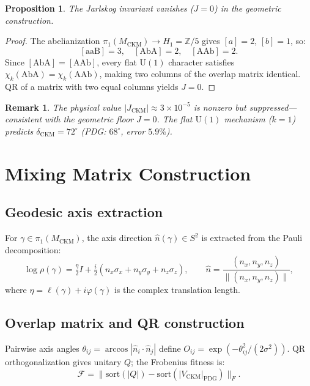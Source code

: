 \documentclass[11pt,a4paper]{article}
\newtheorem{proposition}{Proposition}
\newtheorem{remark}{Remark}
\newcommand{\CKM}{V_{\mathrm{CKM}}}
\begin{document}
\begin{proposition}
The Jarlskog invariant vanishes ($J=0$) in the geometric construction.
\end{proposition}

\begin{proof}
The abelianization $\pi_1(M_{\mathrm{CKM}})\to H_1=\mathbb{Z}/5$
gives $[a]=2$, $[b]=1$, so:
\[
  [\mathrm{aaB}]=3,\quad
  [\mathrm{AbA}]=2,\quad
  [\mathrm{AAb}]=2.
\]
Since $[\mathrm{AbA}]=[\mathrm{AAb}]$, every flat $\mathrm{U}(1)$
character satisfies $\chi_k(\mathrm{AbA})=\chi_k(\mathrm{AAb})$,
making two columns of the overlap matrix identical.
QR of a matrix with two equal columns yields $J=0$.
\end{proof}

\begin{remark}
The physical value $|J_{\mathrm{CKM}}|\approx3\times10^{-5}$ is
nonzero but suppressed---consistent with the geometric floor $J=0$.
The flat $\mathrm{U}(1)$ mechanism ($k=1$) predicts
$\delta_{\mathrm{CKM}}=72^\circ$ (PDG: $68^\circ$, error $5.9\%$).
\end{remark}

\section{Mixing Matrix Construction}
\label{sec:mixing}

\subsection{Geodesic axis extraction}

For $\gamma\in\pi_1(M_{\mathrm{CKM}})$, the axis direction
$\hat{n}(\gamma)\in S^2$ is extracted from the Pauli decomposition:
\[
  \log\rho(\gamma)
  = \tfrac{\eta}{2}I
  + \tfrac{i}{2}(n_x\sigma_x+n_y\sigma_y+n_z\sigma_z),
  \qquad
  \hat{n}=\frac{(n_x,n_y,n_z)}{\|(n_x,n_y,n_z)\|},
\]
where $\eta=\ell(\gamma)+i\varphi(\gamma)$ is the complex translation
length.

\subsection{Overlap matrix and QR construction}

Pairwise axis angles $\theta_{ij}=\arccos|\hat{n}_i\cdot\hat{n}_j|$
define $O_{ij}=\exp(-\theta_{ij}^2/(2\sigma^2))$.
QR orthogonalization gives unitary $Q$; the Frobenius fitness is:
\[
  \mathcal{F}
  = \bigl\|\mathrm{sort}(|Q|)-\mathrm{sort}(|\CKM|_{\mathrm{PDG}})\bigr\|_F.
\]
\end{document}
